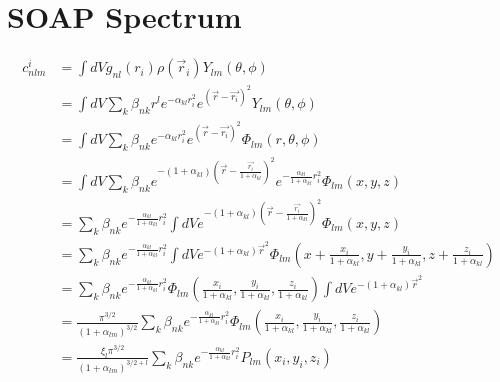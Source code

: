 \documentclass[10pt]{article}
\begin{document}
\maketitle

\section*{SOAP Spectrum}

\begin{align}
c^i_{nlm} &= \int dV g_{nl} (r_i) \rho(\vec{r}_i) Y_{lm}(\theta, \phi) \\
          &= \int dV \sum_k \beta_{nk} r^l e^{-\alpha_{kl} r_i^2}  e^{(\vec{r} - \vec{r_i})^2} Y_{lm}(\theta, \phi) \\
          &= \int dV \sum_k \beta_{nk} e^{-\alpha_{kl} r_i^2}  e^{(\vec{r} - \vec{r_i})^2} \Phi_{lm}(r, \theta, \phi) \\
          &= \int dV \sum_k \beta_{nk} e^{- (1+\alpha_{kl})(\vec{r} - \frac{\vec{r_i}}{1+\alpha_{kl}})^2} e^{-\frac{\alpha_{kl} }{1+\alpha_{kl}} r^2_i} \Phi_{lm}(x, y, z) \\
          &=  \sum_k \beta_{nk} e^{-\frac{\alpha_{kl}}{1+\alpha_{kl}} r^2_i} \int dV  e^{- (1+\alpha_{kl})(\vec{r} - \frac{\vec{r_i}}{1+\alpha_{kl}})^2}  \Phi_{lm}(x, y, z) \\
          &=  \sum_k \beta_{nk} e^{-\frac{\alpha_{kl}}{1+\alpha_{kl}} r^2_i} \int dV  e^{- (1+\alpha_{kl})\vec{r} ^2}  \Phi_{lm}(x+\frac{x_i}{1+\alpha_{kl}}, y +\frac{y_i}{1+\alpha_{kl}}, z+\frac{z_i}{1+\alpha_{kl}}) \label{infinity} \\
          &=  \sum_k \beta_{nk} e^{-\frac{\alpha_{kl}}{1+\alpha_{kl}} r^2_i} \Phi_{lm}(\frac{x_i}{1+\alpha_{kl}}, \frac{y_i}{1+\alpha_{kl}}, \frac{z_i}{1+\alpha_{kl}}) \int dV  e^{- (1+\alpha_{kl})\vec{r} ^2}   \\
          &=  \frac{\pi^{3/2}}{(1+\alpha_{lm})^{3/2}}\sum_k \beta_{nk} e^{-\frac{\alpha_{kl}}{1+\alpha_{kl}} r^2_i} \Phi_{lm}(\frac{x_i}{1+\alpha_{kl}}, \frac{y_i}{1+\alpha_{kl}}, \frac{z_i}{1+\alpha_{kl}}) \\
          &=  \frac{\xi_l\pi^{3/2}}{(1+\alpha_{lm})^{3/2 + l}}\sum_k \beta_{nk} e^{-\frac{\alpha_{kl}}{1+\alpha_{kl}} r^2_i} P_{lm}(x_i, y_i, z_i)  \label{harpoly}
\end{align}
\end{document}
